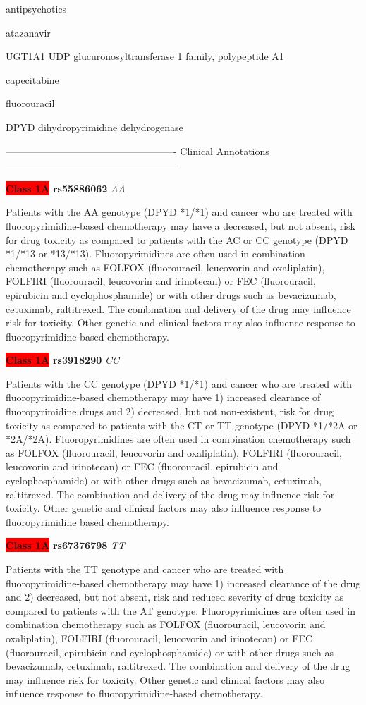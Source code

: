 \documentclass{resume} %
\begin{document}
\begin{rSection}{ antipsychotics }
\begin{rSection}{ atazanavir }
\begin{rSubsection}{ UGT1A1 }{ UDP glucuronosyltransferase 1 family, polypeptide A1 }{}{}
\begin{rSection}{ capecitabine }
\begin{rSection}{ fluorouracil }
\begin{rSubsection}{ DPYD }{ dihydropyrimidine dehydrogenase }{}{}
\item[] ---------------------------------------------------- Clinical Annotations -----------------------------------------------------\newline
\item \textbf{\colorbox{red} {Class 1A}} \textbf{ rs55886062 } \textit{ AA }
\item[] Patients with the AA genotype (DPYD *1/*1) and cancer who are treated with fluoropyrimidine-based chemotherapy may have a decreased, but not absent, risk for drug toxicity as compared to patients with the AC or CC genotype (DPYD *1/*13 or *13/*13). Fluoropyrimidines are often used in combination chemotherapy such as FOLFOX (fluorouracil, leucovorin and oxaliplatin), FOLFIRI (fluorouracil, leucovorin and irinotecan) or FEC (fluorouracil, epirubicin and cyclophosphamide) or with other drugs such as bevacizumab, cetuximab, raltitrexed. The combination and delivery of the drug may influence risk for toxicity. Other genetic and clinical factors may also influence response to fluoropyrimidine-based chemotherapy.\item \textbf{\colorbox{red} {Class 1A}} \textbf{ rs3918290 } \textit{ CC }
\item[] Patients with the CC genotype (DPYD *1/*1) and cancer who are treated with fluoropyrimidine-based chemotherapy may have 1) increased clearance of fluoropyrimidine drugs and 2) decreased, but not non-existent, risk for drug toxicity as compared to patients with the CT or TT genotype (DPYD *1/*2A or *2A/*2A). Fluoropyrimidines are often used in combination chemotherapy such as FOLFOX (fluorouracil, leucovorin and oxaliplatin), FOLFIRI (fluorouracil,  leucovorin and irinotecan) or FEC (fluorouracil, epirubicin and cyclophosphamide) or with other drugs such as bevacizumab, cetuximab, raltitrexed. The combination and delivery of the drug may influence risk for toxicity. Other genetic and clinical factors may also influence response to fluoropyrimidine based chemotherapy.\item \textbf{\colorbox{red} {Class 1A}} \textbf{ rs67376798 } \textit{ TT }
\item[] Patients with the TT genotype and cancer who are treated with fluoropyrimidine-based chemotherapy may have 1) increased clearance of the drug and 2) decreased, but not absent, risk and reduced severity of drug toxicity as compared to patients with the AT genotype. Fluoropyrimidines are often used in combination chemotherapy such as FOLFOX (fluorouracil, leucovorin and oxaliplatin), FOLFIRI (fluorouracil, leucovorin and irinotecan) or FEC (fluorouracil, epirubicin and cyclophosphamide) or with other drugs such as bevacizumab, cetuximab, raltitrexed. The combination and delivery of the drug may influence risk for toxicity. Other genetic and clinical factors may also influence response to fluoropyrimidine-based chemotherapy.

\end{rSubsection}
\end{rSection}
\end{rSection}
\end{rSubsection}
\end{rSection}
\end{rSection}
\end{document}
